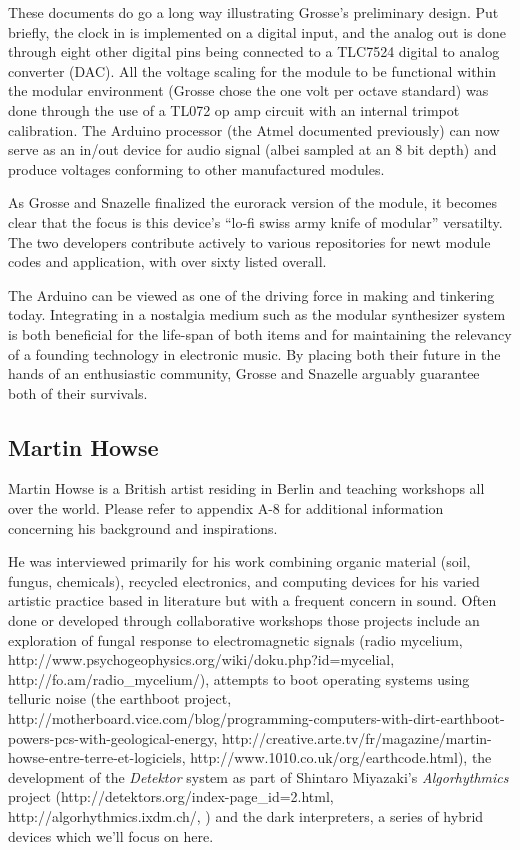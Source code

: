 These documents do go a long way illustrating Grosse's preliminary design. Put briefly, the clock in is implemented on a digital input, and the analog out is done through eight other digital pins being connected to a TLC7524 digital to analog converter (DAC). All the voltage scaling for the module to be functional within the modular environment (Grosse chose the one volt per octave standard) was done through the use of a TL072 op amp circuit with an internal trimpot calibration. The Arduino processor (the Atmel documented previously) can now serve as an in/out device for audio signal (albei sampled at an 8 bit depth) and produce voltages conforming to other manufactured modules. 

As Grosse and Snazelle finalized the eurorack version of the module, it becomes clear that the focus is this device's ``lo-fi swiss army knife of modular'' versatilty. The two developers contribute actively to various repositories for newt module codes and application, with over sixty listed overall. 

The Arduino can be viewed as one of the driving force in making and tinkering today. Integrating in a nostalgia medium such as the modular synthesizer system is both beneficial for the life-span of both items and for maintaining the relevancy of a founding technology in electronic music. By placing both their future in the hands of an enthusiastic community, Grosse and Snazelle arguably guarantee both of their survivals.  



\subsection{Martin Howse}

Martin Howse is a British artist residing in Berlin and teaching workshops all over the world. Please refer to appendix A-8 for additional information concerning his background and inspirations. 

He was interviewed primarily for his work combining organic material (soil, fungus, chemicals), recycled electronics, and computing devices for his varied artistic practice based in literature but with a frequent concern in sound. Often done or developed through collaborative workshops those projects include an exploration of fungal response to electromagnetic signals (radio mycelium, http://www.psychogeophysics.org/wiki/doku.php?id=mycelial, http://fo.am/radio_mycelium/), attempts to boot operating systems using telluric noise (the earthboot project, http://motherboard.vice.com/blog/programming-computers-with-dirt-earthboot-powers-pcs-with-geological-energy, http://creative.arte.tv/fr/magazine/martin-howse-entre-terre-et-logiciels, http://www.1010.co.uk/org/earthcode.html), the development of the \emph{Detektor} system as part of Shintaro Miyazaki's \emph{Algorhythmics} project (http://detektors.org/index-page_id=2.html, http://algorhythmics.ixdm.ch/, \citep{miyazaki2010}) and the dark interpreters, a series of hybrid devices which we'll focus on here. 

